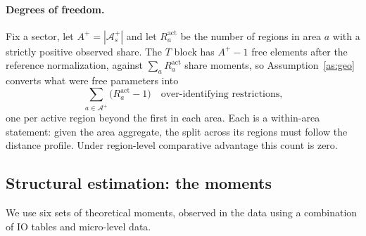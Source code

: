 \paragraph{Degrees of freedom.} Fix a sector, let $A^{+}=|\mathcal{A}^{+}_{s}|$ and let
$R^{\mathrm{act}}_{a}$ be the number of regions in area $a$ with a strictly positive observed
share. The $T$ block has $A^{+}-1$ free elements after the reference normalization, against
$\sum_{a}R^{\mathrm{act}}_{a}$ share moments, so Assumption~\ref{as:geo} converts what were free
parameters into
\begin{equation}
\sum_{a\in\mathcal{A}^{+}}\big(R^{\mathrm{act}}_{a}-1\big)
\quad\text{over-identifying restrictions,}
\end{equation}
one per active region beyond the first in each area. Each is a within-area statement: given the
area aggregate, the split across its regions must follow the distance profile. Under
region-level comparative advantage this count is zero.

\subsection{Structural estimation: the moments}
\label{app:model-moments}

We use six sets of theoretical moments, observed in the data using a combination of IO tables
and micro-level data.

